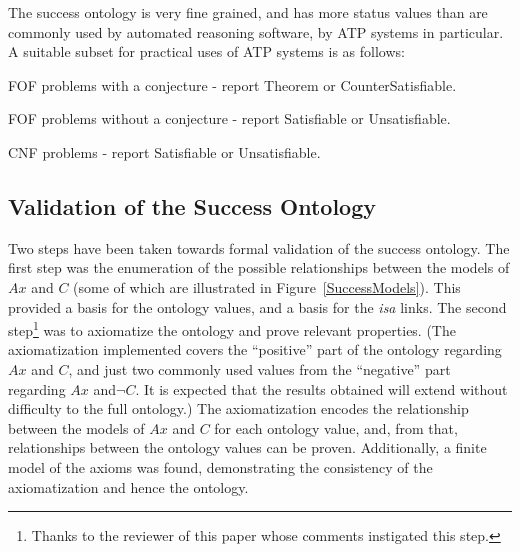 \documentclass[a4paper]{easychair}
\newenvironment{packed_itemize}{
\vspace*{-0.5em}
\begin{itemize}
  \setlength{\partopsep}{0pt}
  \setlength{\itemsep}{1pt}
  \setlength{\parskip}{0pt}
  \setlength{\parsep}{0pt}
}{\end{itemize}}
\begin{document}
The success ontology is very fine grained, and has more status values
than are commonly used by automated reasoning software, by ATP systems
in particular.
A suitable subset for practical uses of ATP systems is as follows:
\begin{packed_itemize}
\item FOF problems with a conjecture - report Theorem or CounterSatisfiable.
\item FOF problems without a conjecture - report Satisfiable or Unsatisfiable.
\item CNF problems - report Satisfiable or Unsatisfiable.
\end{packed_itemize}

\subsection{Validation of the Success Ontology}
\label{Validation}

Two steps have been taken towards formal validation of the success
ontology.
The first step was the enumeration of the possible relationships between the
models of $Ax$ and $C$ (some of which are illustrated in
Figure~\ref{SuccessModels}).
This provided a basis for the ontology values, and a basis for the
{\em isa} links.
The second step\footnote{%
Thanks to the reviewer of this paper whose comments instigated this step.}
was to axiomatize the ontology and prove relevant properties.
(The axiomatization implemented covers the ``positive'' part of the
ontology regarding $Ax$ and $C$, and just two commonly used values from
the ``negative'' part regarding $Ax$ and$\neg C$.
It is expected that the results obtained will extend without difficulty
to the full ontology.)
The axiomatization encodes the relationship between the models of
$Ax$ and $C$ for each ontology value, and, from that, relationships
between the ontology values can be proven.
Additionally, a finite model of the axioms was found, demonstrating the
consistency of the axiomatization and hence the ontology.
\end{document}
